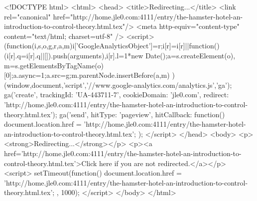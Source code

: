 <!DOCTYPE html>
<html>
<head>
<title>Redirecting...</title>
<link rel="canonical" href="http://home.jle0.com:4111/entry/the-hamster-hotel-an-introduction-to-control-theory.html.tex"/>
<meta http-equiv="content-type" content="text/html; charset=utf-8" />
<script>
(function(i,s,o,g,r,a,m){i['GoogleAnalyticsObject']=r;i[r]=i[r]||function(){
(i[r].q=i[r].q||[]).push(arguments)},i[r].l=1*new Date();a=s.createElement(o),
m=s.getElementsByTagName(o)[0];a.async=1;a.src=g;m.parentNode.insertBefore(a,m)
})(window,document,'script','//www.google-analytics.com/analytics.js','ga');
ga('create', { trackingId: 'UA-443711-7', cookieDomain: 'jle0.com', redirect: 'http://home.jle0.com:4111/entry/the-hamster-hotel-an-introduction-to-control-theory.html.tex'});
ga('send', { hitType: 'pageview', hitCallback: function() { document.location.href = 'http://home.jle0.com:4111/entry/the-hamster-hotel-an-introduction-to-control-theory.html.tex'; } });
</script>
</head>
<body>
  <p><strong>Redirecting...</strong></p>
  <p><a href='http://home.jle0.com:4111/entry/the-hamster-hotel-an-introduction-to-control-theory.html.tex'>Click here if you are not redirected.</a></p>
  <script>
    setTimeout(function() { document.location.href = 'http://home.jle0.com:4111/entry/the-hamster-hotel-an-introduction-to-control-theory.html.tex'; }, 1000);
  </script>
</body>
</html>
